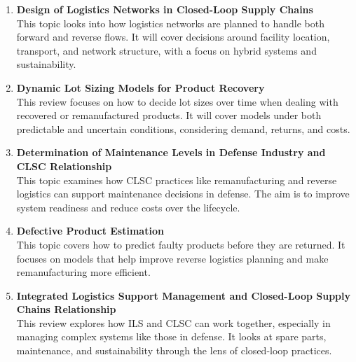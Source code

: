 \documentclass[12pt]{article}
\begin{document}
\begin{enumerate}[label=\textbf{\arabic*.}]
    \item \textbf{Design of Logistics Networks in Closed-Loop Supply Chains} \\
    This topic looks into how logistics networks are planned to handle both forward and reverse flows. It will cover decisions around facility location, transport, and network structure, with a focus on hybrid systems and sustainability.

    \item \textbf{Dynamic Lot Sizing Models for Product Recovery} \\
    This review focuses on how to decide lot sizes over time when dealing with recovered or remanufactured products. It will cover models under both predictable and uncertain conditions, considering demand, returns, and costs.

    \item \textbf{Determination of Maintenance Levels in Defense Industry and CLSC Relationship} \\
    This topic examines how CLSC practices like remanufacturing and reverse logistics can support maintenance decisions in defense. The aim is to improve system readiness and reduce costs over the lifecycle.

    \item \textbf{Defective Product Estimation} \\
    This topic covers how to predict faulty products before they are returned. It focuses on models that help improve reverse logistics planning and make remanufacturing more efficient.

    \item \textbf{Integrated Logistics Support Management and Closed-Loop Supply Chains Relationship} \\
    This review explores how ILS and CLSC can work together, especially in managing complex systems like those in defense. It looks at spare parts, maintenance, and sustainability through the lens of closed-loop practices.
\end{enumerate}
\end{document}

